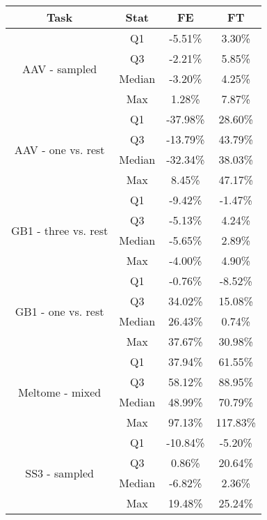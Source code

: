 \documentclass{standalone}
\begin{document}
	\centering
	\renewcommand{\arraystretch}{1.5}
	\begin{tabular}{c|ccc}
	\multicolumn{1}{c|}{Task} & \multicolumn{1}{c}{Stat} & \multicolumn{1}{c}{FE} & FT \\
	\hline
	\multirow{4}{*}{AAV - sampled} & Q1 & -5.51\% & 3.30\% \\
	 & Q3 & -2.21\% & 5.85\% \\
	 & Median & -3.20\% & 4.25\% \\
	 & Max & 1.28\% & 7.87\% \\
	\hline
	\multirow{4}{*}{AAV - one vs. rest} & Q1 & -37.98\% & 28.60\% \\
	 & Q3 & -13.79\% & 43.79\% \\
	 & Median & -32.34\% & 38.03\% \\
	 & Max & 8.45\% & 47.17\% \\
	\hline
	\multirow{4}{*}{GB1 - three vs. rest} & Q1 & -9.42\% & -1.47\% \\
	 & Q3 & -5.13\% & 4.24\% \\
	 & Median & -5.65\% & 2.89\% \\
	 & Max & -4.00\% & 4.90\% \\
	\hline
	\multirow{4}{*}{GB1 - one vs. rest} & Q1 & -0.76\% & -8.52\% \\
	 & Q3 & 34.02\% & 15.08\% \\
	 & Median & 26.43\% & 0.74\% \\
	 & Max & 37.67\% & 30.98\% \\
	\hline
	\multirow{4}{*}{Meltome - mixed} & Q1 & 37.94\% & 61.55\% \\
	 & Q3 & 58.12\% & 88.95\% \\
	 & Median & 48.99\% & 70.79\% \\
	 & Max & 97.13\% & 117.83\% \\
	\hline
	\multirow{4}{*}{SS3 - sampled} & Q1 & -10.84\% & -5.20\% \\
	 & Q3 & 0.86\% & 20.64\% \\
	 & Median & -6.82\% & 2.36\% \\
	 & Max & 19.48\% & 25.24\% \\
	\hline
	\end{tabular}
\end{document}
